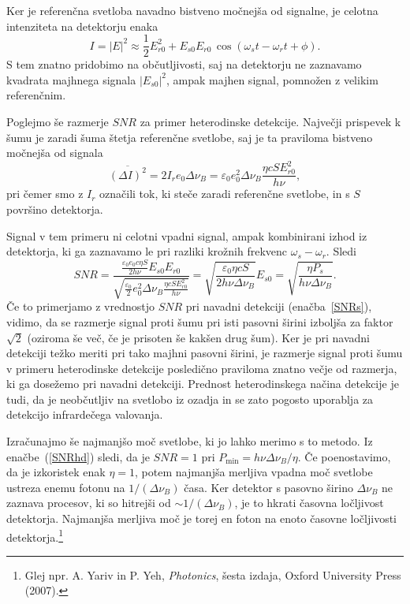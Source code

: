 Ker je referenčna svetloba navadno bistveno močnejša od signalne, je celotna intenziteta
na detektorju enaka
\begin{equation}
I = |E|^2 \approx \frac{1}{2}E_{r0}^2 + E_{s0}E_{r0}\,\cos(\omega_st-\omega_rt+\phi).
\end{equation}
S tem znatno pridobimo na občutljivosti, saj na detektorju ne zaznavamo  
kvadrata majhnega signala $|E_{s0}|^2$, ampak majhen signal, pomnožen z velikim referenčnim. 

Poglejmo še razmerje $SNR$ za primer heterodinske detekcije. Največji prispevek k šumu je 
zaradi šuma štetja referenčne svetlobe, saj je ta praviloma bistveno močnejša od signala
\begin{equation}
\overline{(\Delta I)^2} = 2I_re_0 \Delta\nu_B= \varepsilon_0 
e_0^2\Delta\nu_B\frac{\eta c S E_{r0}^2}{h\nu},
\end{equation}
pri čemer smo z $I_r$ označili tok, ki steče zaradi referenčne svetlobe, in s $S$  
površino detektorja. 

Signal v tem primeru ni celotni vpadni signal, ampak kombinirani izhod iz 
detektorja, ki ga zaznavamo le pri razliki krožnih frekvenc $\omega_s-\omega_r$. Sledi
\begin{equation}
SNR = \frac{\frac{\varepsilon_0 e_0 c \eta S}{2h \nu} E_{s0}E_{r0}}{\sqrt{\frac{\varepsilon_0}{2}
e_0^2 \Delta\nu_B\frac{\eta c S E_{r0}^2}{h\nu}}} = 
\sqrt{\frac{\varepsilon_0\eta c S}{2 h \nu \Delta\nu_B}}E_{s0} = 
\sqrt{\frac{\eta P_s}{h \nu \Delta \nu_B}}.
\label{SNRhd}
\end{equation}
Če to primerjamo z vrednostjo $SNR$ pri navadni detekciji (enačba~\ref{SNRs}), 
vidimo, 
da se razmerje signal proti šumu pri isti pasovni širini izboljša za faktor $\sqrt{2}$
(oziroma še več, če je prisoten še kakšen drug šum).
Ker je pri navadni detekciji težko meriti pri tako majhni pasovni širini, je razmerje
signal proti šumu v primeru heterodinske detekcije posledično praviloma znatno večje
od razmerja, ki ga dosežemo pri navadni detekciji. Prednost heterodinskega 
načina detekcije je tudi, da je neobčutljiv na svetlobo iz ozadja in se 
zato pogosto uporablja za detekcijo infrardečega valovanja.

Izračunajmo še najmanjšo moč svetlobe, ki jo lahko merimo s to metodo. Iz enačbe~(\ref{SNRhd}) 
sledi, da je $SNR=1$ pri $P_{\mathrm{min}} = h\nu \Delta \nu_B/\eta$. Če poenostavimo, da
je izkoristek enak $\eta = 1$, potem najmanjša merljiva vpadna moč svetlobe ustreza
enemu fotonu na $1/(\Delta\nu_B)$ časa. Ker detektor s pasovno širino $\Delta\nu_B$
ne zaznava procesov, ki so hitrejši od $\sim 1/(\Delta\nu_B)$, je to hkrati časovna ločljivost
detektorja. Najmanjša merljiva moč je torej en foton na enoto časovne ločljivosti 
detektorja.\footnote{Glej npr. A. Yariv in P. Yeh, {\it Photonics}, šesta izdaja, Oxford
University Press (2007).}
